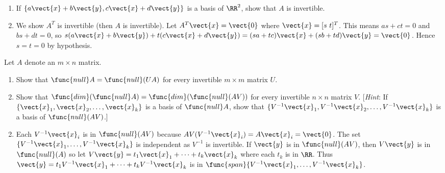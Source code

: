 \begin{multicols}{2}
\begin{ex}
\begin{enumerate}[label={\alph*.}]
\item If $\{a\vect{x} + b\vect{y}, c\vect{x} + d\vect{y}\}$ is a basis of $\RR^2$, show that $A$ is invertible.

\end{enumerate}
\begin{sol}
\begin{enumerate}[label={\alph*.}]
\setcounter{enumi}{1}
\item  We show $A^{T}$ is invertible (then $A$ is invertible). Let $A^{T}\vect{x} = \vect{0}$ where $\vect{x} = [s\ t]^{T}$. This means
  $as + ct = 0$ and $bs + dt = 0$, so $s(a\vect{x} + b\vect{y}) + t(c\vect{x} + d\vect{y}) = (sa + tc)\vect{x} + (sb + td)\vect{y} = \vect{0}$. Hence $s = t = 0$ by hypothesis.

\end{enumerate}
\end{sol}
\end{ex}

\begin{ex}
Let $A$ denote an $m \times n$ matrix.

\begin{enumerate}[label={\alph*.}]
\item Show that $\func{null} A = \func{null}(UA)$ for every invertible $m \times m$ matrix $U$.

\item Show that $\func{dim}(\func{null} A) = \func{dim}(\func{null}(AV))$ for every invertible $n \times n$ matrix $V$. [\textit{Hint}: If $\{\vect{x}_{1}, \vect{x}_{2}, \dots, \vect{x}_{k}\}$ is a basis of $\func{null} A$, show that $\{V^{-1}\vect{x}_{1}, V^{-1}\vect{x}_{2}, \dots, V^{-1}\vect{x}_{k}\}$ is a basis of $\func{null}(AV)$.]

\end{enumerate}
\begin{sol}
\begin{enumerate}[label={\alph*.}]
\setcounter{enumi}{1}
\item  Each $V^{-1}\vect{x}_{i}$ is in $\func{null}(AV)$ because $AV(V^{-1}\vect{x}_{i}) = A\vect{x}_{i} = \vect{0}$. The set $\{V^{-1}\vect{x}_{1}, \dots, V^{-1}\vect{x}_{k}\}$ is independent as $V^{-1}$ is invertible. If $\vect{y}$ is in $\func{null}(AV)$, then $V\vect{y}$ is in $\func{null}(A)$ so let $V\vect{y} = t_{1}\vect{x}_{1} + \dots + t_{k}\vect{x}_{k}$ where each $t_{k}$ is in $\RR$. Thus $\vect{y} = t_{1}V^{-1}\vect{x}_{1} + \dots + t_{k}V^{-1}\vect{x}_{k}$ is in $\func{span}\{V^{-1}\vect{x}_{1}, \dots, V^{-1}\vect{x}_{k}\}$.


\end{enumerate}
\end{sol}
\end{ex}
\end{multicols}
